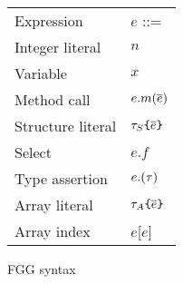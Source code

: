 \documentclass[acmsmall,screen]{acmart}
\begin{document}
\begin{figure}
{\begin{minipage}[t]{0.4\textwidth}
\begin{tabular}[t]{ll}
                Expression                        & $e$ ::=                                                  \\
                \quad Integer literal             & \quad$n$                                                 \\
                \quad Variable                    & \quad $x$                                                \\
                \quad Method call                 & \quad $e.m(\overline{e})$                                      \\
                \quad Structure literal           & \quad ${\color{black}\tau_S}\texttt{\{}\overline{e}\texttt{\}}$                        \\
                \quad Select                      & \quad $e.f$                                              \\
                \quad Type assertion              & \quad $e.({\color{black}\tau})$                                 \\
                \quad Array literal               & \quad${\color{black}\tau_A}\texttt{\{}\overline{e}\texttt{\}}$                         \\
                \quad Array index                 & \quad$e$[$e$]
            \end{tabular}
        \end{minipage}
    }
    \caption{FGG syntax}
    \vspace{3ex}
\end{figure}
\end{document}
